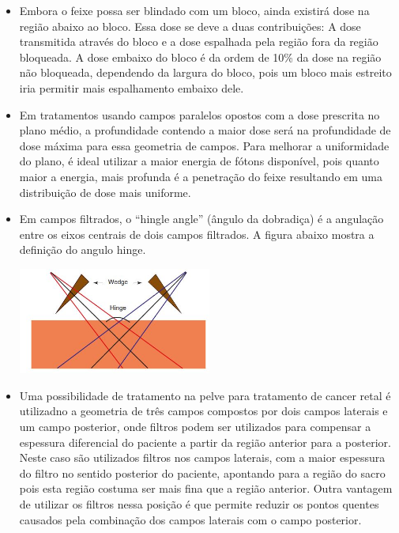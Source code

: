 \documentclass[11pt,a4paper]{article}
\newcounter{exemplo}
\begin{document}
\begin{exemplo}
\begin{itemize}
        \item Embora o feixe possa ser blindado com um bloco, ainda existirá dose na região abaixo ao bloco. Essa dose se deve a duas contribuições: A dose transmitida através do bloco e a dose espalhada pela região fora da região bloqueada. A dose embaixo do bloco é da ordem de 10\% da dose na região não bloqueada, dependendo da largura do bloco, pois um bloco mais estreito iria permitir mais espalhamento embaixo dele.


        \item Em tratamentos usando campos paralelos opostos com a dose prescrita no plano médio, a profundidade contendo a maior dose será na profundidade de dose máxima para essa geometria de campos. Para melhorar a uniformidade do plano, é ideal utilizar a maior energia de fótons disponível, pois quanto maior a energia, mais profunda é a penetração do feixe resultando em uma distribuição de dose mais uniforme. 
        
        \item Em campos filtrados, o ``hingle angle'' (ângulo da dobradiça) é a angulação entre os eixos centrais de dois campos filtrados. A figura abaixo mostra a definição do angulo hinge. 
        
            \begin{center}
                \includegraphics[width=0.5\textwidth]{Imagens/hinge.JPG}
            \end{center}
        
        \item Uma possibilidade de tratamento na pelve para tratamento de cancer retal é utilizadno a geometria de três campos compostos por dois campos laterais e um campo posterior, onde filtros podem ser utilizados para compensar a espessura diferencial do paciente a partir da região anterior para a posterior. Neste caso são utilizados filtros nos campos laterais, com a maior espessura do filtro no sentido posterior do paciente, apontando para a região do sacro pois esta região costuma ser mais fina que a região anterior. Outra vantagem de utilizar os filtros nessa posição é que permite reduzir os pontos quentes causados pela combinação dos campos laterais com o campo posterior.
        

\end{itemize}
\end{exemplo}
\end{document}
